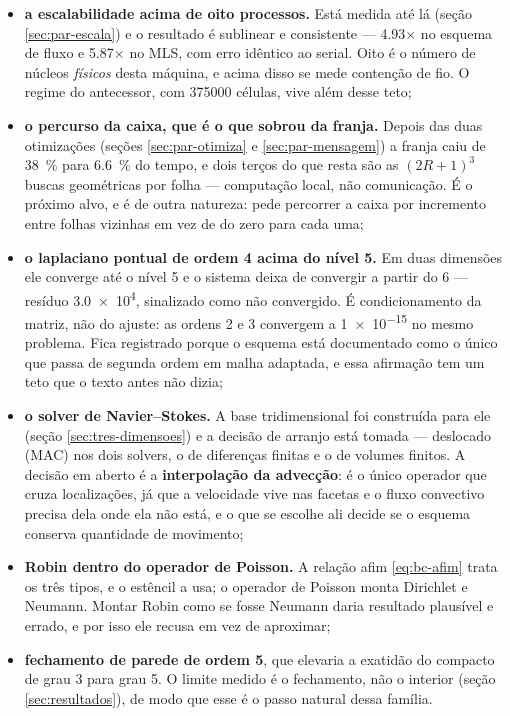 \begin{itemize}
\item \textbf{a escalabilidade acima de oito processos.} Está medida até lá
      (seção \ref{sec:par-escala}) e o resultado é sublinear e consistente ---
      \num{4.93}$\times$ no esquema de fluxo e \num{5.87}$\times$ no MLS, com
      erro idêntico ao serial. Oito é o número de núcleos \emph{físicos} desta
      máquina, e acima disso se mede contenção de fio. O regime do antecessor,
      com \num{375000} células, vive além desse teto;
\item \textbf{o percurso da caixa, que é o que sobrou da franja.} Depois das
      duas otimizações (seções \ref{sec:par-otimiza} e
      \ref{sec:par-mensagem}) a franja caiu de \SI{38}{\percent} para
      \SI{6.6}{\percent} do tempo, e dois terços do que resta são as
      $(2R+1)^3$ buscas geométricas por folha --- computação local, não
      comunicação. É o próximo alvo, e é de outra natureza: pede percorrer a
      caixa por incremento entre folhas vizinhas em vez de do zero para cada
      uma;
\item \textbf{o laplaciano pontual de ordem 4 acima do nível 5.} Em duas
      dimensões ele converge até o nível 5 e o sistema deixa de convergir a
      partir do 6 --- resíduo \num{3.0e4}, sinalizado como não convergido. É
      condicionamento da matriz, não do ajuste: as ordens 2 e 3 convergem a
      \num{1e-15} no mesmo problema. Fica registrado porque o esquema está
      documentado como o único que passa de segunda ordem em malha adaptada, e
      essa afirmação tem um teto que o texto antes não dizia;
\item \textbf{o solver de Navier--Stokes.} A base tridimensional foi construída
      para ele (seção \ref{sec:tres-dimensoes}) e a decisão de arranjo está
      tomada --- deslocado (MAC) nos dois solvers, o de diferenças finitas e o
      de volumes finitos. A decisão em aberto é a \textbf{interpolação da
      advecção}: é o único operador que cruza localizações, já que a velocidade
      vive nas facetas e o fluxo convectivo precisa dela onde ela não está, e o
      que se escolhe ali decide se o esquema conserva quantidade de movimento;
\item \textbf{Robin dentro do operador de Poisson.} A relação afim
      \eqref{eq:bc-afim} trata os três tipos, e o estêncil a usa; o operador de
      Poisson monta Dirichlet e Neumann. Montar Robin como se fosse Neumann daria
      resultado plausível e errado, e por isso ele recusa em vez de aproximar;
\item \textbf{fechamento de parede de ordem 5}, que elevaria a exatidão do
      compacto de grau 3 para grau 5. O limite medido é o fechamento, não o
      interior (seção \ref{sec:resultados}), de modo que esse é o passo natural
      dessa família.
\end{itemize}

